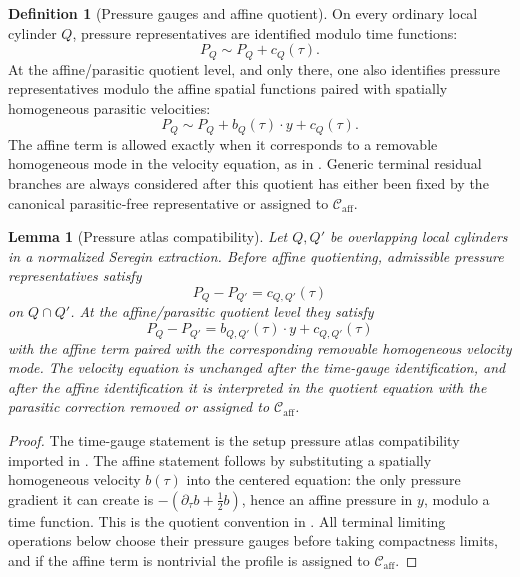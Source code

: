 \documentclass[11pt]{amsart}
\numberwithin{equation}{section}
\theoremstyle{plain}
\newtheorem{lemma}[lemma]{Lemma}
\theoremstyle{definition}
\newtheorem{definition}[definition]{Definition}
\theoremstyle{remark}
\newcommand{\Caff}{\mathcal C_{\mathrm{aff}}}
\begin{document}
\begin{definition}[Pressure gauges and affine quotient]
\label{def:pressure-gauge-affine-quotient}
On every ordinary local cylinder \(Q\), pressure representatives are identified
modulo time functions:
\[
   P_Q\sim P_Q+c_Q(\tau).
\]
At the affine/parasitic quotient level, and only there, one also identifies
pressure representatives modulo the affine spatial functions paired with
spatially homogeneous parasitic velocities:
\[
   P_Q\sim P_Q+b_Q(\tau)\cdot y+c_Q(\tau).
\]
The affine term is allowed exactly when it corresponds to a removable
homogeneous mode in the velocity equation, as in
.  Generic terminal residual branches
are always considered after this quotient has either been fixed by the
canonical parasitic-free representative or assigned to \(\Caff\).
\end{definition}

\begin{lemma}[Pressure atlas compatibility]
\label{lem:typeI-pressure-atlas-compatibility}
Let \(Q,Q'\) be overlapping local cylinders in a normalized Seregin extraction.
Before affine quotienting, admissible pressure representatives satisfy
\[
   P_Q-P_{Q'}=c_{Q,Q'}(\tau)
\]
on \(Q\cap Q'\).  At the affine/parasitic quotient level they satisfy
\[
   P_Q-P_{Q'}=b_{Q,Q'}(\tau)\cdot y+c_{Q,Q'}(\tau)
\]
with the affine term paired with the corresponding removable homogeneous
velocity mode.  The velocity equation is unchanged after the time-gauge
identification, and after the affine identification it is interpreted in the
quotient equation with the parasitic correction removed or assigned to
\(\Caff\).
\end{lemma}

\begin{proof}
The time-gauge statement is the setup pressure atlas compatibility imported in
.  The affine statement follows by substituting
a spatially homogeneous velocity \(b(\tau)\) into the centered equation:
the only pressure gradient it can create is
\(-(\partial_\tau b+\frac12b)\), hence an affine pressure in \(y\), modulo a
time function.  This is the quotient convention in
.  All terminal limiting operations
below choose their pressure gauges before taking compactness limits, and if the
affine term is nontrivial the profile is assigned to \(\Caff\).
\end{proof}
\end{document}
